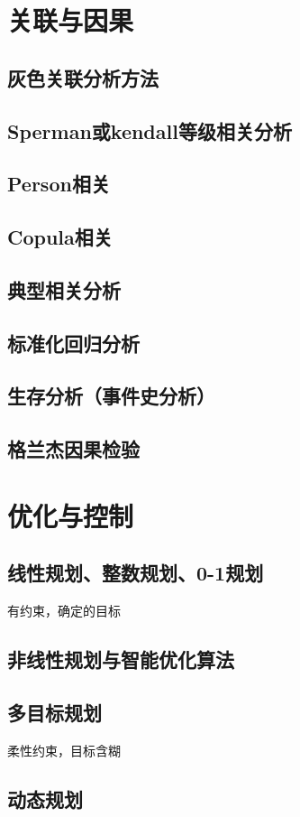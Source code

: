 \documentclass[openany]{progbookcn}
\begin{document}
\chapter{关联与因果}
\section{灰色关联分析方法}
\section{Sperman或kendall等级相关分析}
\section{Person相关}
\section{Copula相关}
\section{典型相关分析}
\section{标准化回归分析}
\section{生存分析（事件史分析）}
\section{格兰杰因果检验}
\chapter{优化与控制}
\section{线性规划、整数规划、0-1规划}
有约束，确定的目标
\section{非线性规划与智能优化算法}
\section{多目标规划}
柔性约束，目标含糊
\section{动态规划}
\end{document}
